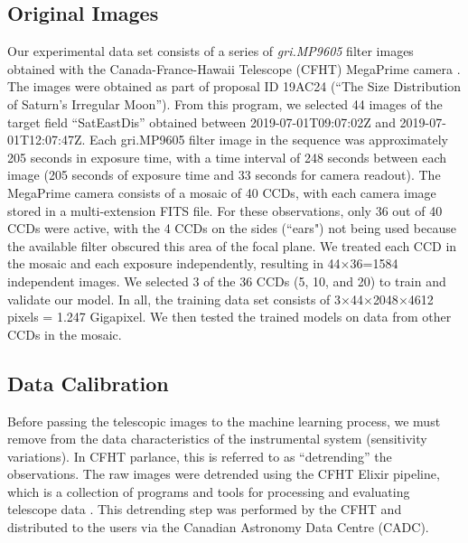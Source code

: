 \documentclass{aastex631}
\begin{document}
\subsection{Original Images}
Our experimental data set consists of a series of \textit{gri.MP9605} filter images obtained with the Canada-France-Hawaii Telescope (CFHT) MegaPrime camera \citep{1998SPIE.3355..614B}.
The images were obtained as part of proposal ID 19AC24 (``The Size Distribution of Saturn's Irregular Moon'').
From this program, we selected 44 images of the target field ``SatEastDis'' obtained between 2019-07-01T09:07:02Z and 2019-07-01T12:07:47Z.
Each gri.MP9605 filter image in the sequence was approximately 205 seconds in exposure time, with a time interval of 248 seconds between each image (205 seconds of exposure time and 33 seconds for camera readout).
The MegaPrime camera consists of a mosaic of 40 CCDs, with each camera image stored in a multi-extension FITS file. 
For these observations, only 36 out of 40 CCDs were active, with the 4 CCDs on the sides (``ears") not being used because the available filter obscured this area of the focal plane.
We treated each CCD in the mosaic and each exposure independently, resulting in 44$\times$36=1584 independent images.
We selected 3 of the 36 CCDs (5, 10, and 20) to train and validate our model.
In all, the training data set consists of 3$\times$44$\times$2048$\times$4612 pixels = 1.247 Gigapixel.
We then tested the trained models on data from other CCDs in the mosaic.

\subsection{Data Calibration}
\label{subsect:LSST}
Before passing the telescopic images to the machine learning process, we must remove from the data characteristics of the instrumental system (sensitivity variations).
In CFHT parlance, this is referred to as ``detrending'' the observations.
The raw images were detrended using the CFHT Elixir pipeline, which is a collection of programs and tools for processing and evaluating telescope data \citep{2004PASP..116..449M}.
This detrending step was performed by the CFHT and distributed to the users via the Canadian Astronomy Data Centre (CADC).
\end{document}
